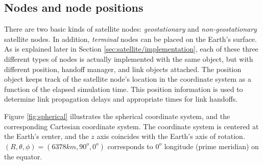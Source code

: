 
\subsection{Nodes and node positions}
\label{sec:satellite/usage/nodes}

There are two basic kinds of satellite nodes:  {\em geostationary}  
and {\em non-geostationary} satellite nodes.  In addition, {\em terminal} nodes
can be placed on the Earth's surface.  As is explained later in 
Section \ref{sec:satellite/implementation},
each of these three different types of nodes is actually implemented with 
the same  object, but with different position,
handoff manager,  and link objects attached.  
The position object keeps track of the satellite node's location 
in the coordinate system as a function of the elapsed simulation time.
This position information is used to determine link propagation delays and
appropriate times for link handoffs. 

Figure \ref{fig:spherical} illustrates the spherical coordinate system,
and the corresponding Cartesian coordinate system.
The coordinate system is centered at the 
Earth's center, and the $z$ axis coincides with the Earth's axis of rotation.  
$(R,\theta,\phi) = (6378 km, 90^o, 0^o)$ corresponds to $0^o$ longitude 
(prime meridian) on the equator.

